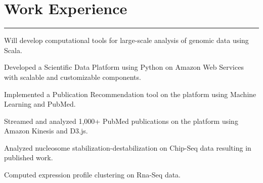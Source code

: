 \documentclass[letterpaper]{deedy-resume} %
\newcommand{\colorrule}[1]{%
\begingroup\color{#1}\hrule\endgroup%
}%
\begin{document}
\section{Work Experience}
\normalfont
\colorrule{black}
\vspace{2 mm}
\hfill
{}
\hfill
{}
\vspace{1 mm}
\begin{tightitemize}
	\item Will develop computational tools for large-scale analysis of genomic data using Scala.	 
\end{tightitemize}
\vspace{2 mm}
\hfill
{}
\hfill
{}
\vspace{1 mm}
\begin{tightitemize}
	\item Developed a Scientific Data Platform using Python on Amazon Web Services with scalable and customizable components.
	\item Implemented a Publication Recommendation tool on the platform using Machine Learning and PubMed.	
	\item Streamed and analyzed 1,000+ PubMed publications on the platform using Amazon Kinesis and D3.js. 
\end{tightitemize}
\vspace{2 mm}
\hfill
{}
\hfill
{}
\vspace{1 mm}
\begin{tightitemize}
	\item Analyzed nucleosome stabilization-destabilization  on Chip-Seq data resulting in published work. 
	\item Computed expression profile clustering on Rna-Seq data. 	
\end{tightitemize}
\end{document}
